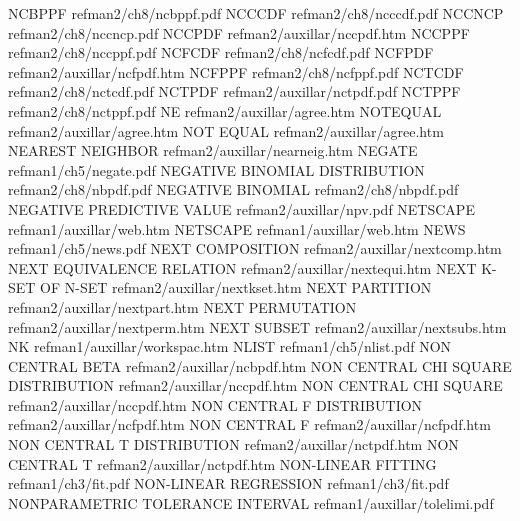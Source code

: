 NCBPPF                                  refman2/ch8/ncbppf.pdf
NCCCDF                                  refman2/ch8/ncccdf.pdf
NCCNCP                                  refman2/ch8/nccncp.pdf
NCCPDF                                  refman2/auxillar/nccpdf.htm
NCCPPF                                  refman2/ch8/nccppf.pdf
NCFCDF                                  refman2/ch8/ncfcdf.pdf
NCFPDF                                  refman2/auxillar/ncfpdf.htm
NCFPPF                                  refman2/ch8/ncfppf.pdf
NCTCDF                                  refman2/ch8/nctcdf.pdf
NCTPDF                                  refman2/auxillar/nctpdf.pdf
NCTPPF                                  refman2/ch8/nctppf.pdf
NE                                      refman2/auxillar/agree.htm
NOTEQUAL                                refman2/auxillar/agree.htm
NOT EQUAL                               refman2/auxillar/agree.htm
NEAREST NEIGHBOR                        refman2/auxillar/nearneig.htm
NEGATE                                  refman1/ch5/negate.pdf
NEGATIVE BINOMIAL DISTRIBUTION          refman2/ch8/nbpdf.pdf
NEGATIVE BINOMIAL                       refman2/ch8/nbpdf.pdf
NEGATIVE PREDICTIVE VALUE               refman2/auxillar/npv.pdf
NETSCAPE                                refman1/auxillar/web.htm
NETSCAPE                                refman1/auxillar/web.htm
NEWS                                    refman1/ch5/news.pdf
NEXT COMPOSITION                        refman2/auxillar/nextcomp.htm
NEXT EQUIVALENCE RELATION               refman2/auxillar/nextequi.htm
NEXT K-SET OF N-SET                     refman2/auxillar/nextkset.htm
NEXT PARTITION                          refman2/auxillar/nextpart.htm
NEXT PERMUTATION                        refman2/auxillar/nextperm.htm
NEXT SUBSET                             refman2/auxillar/nextsubs.htm
NK                                      refman1/auxillar/workspac.htm
NLIST                                   refman1/ch5/nlist.pdf
NON CENTRAL BETA                        refman2/auxillar/ncbpdf.htm
NON CENTRAL CHI SQUARE DISTRIBUTION     refman2/auxillar/nccpdf.htm
NON CENTRAL CHI SQUARE                  refman2/auxillar/nccpdf.htm
NON CENTRAL F DISTRIBUTION              refman2/auxillar/ncfpdf.htm
NON CENTRAL F                           refman2/auxillar/ncfpdf.htm
NON CENTRAL T DISTRIBUTION              refman2/auxillar/nctpdf.htm
NON CENTRAL T                           refman2/auxillar/nctpdf.htm
NON-LINEAR FITTING                      refman1/ch3/fit.pdf
NON-LINEAR REGRESSION                   refman1/ch3/fit.pdf
NONPARAMETRIC TOLERANCE INTERVAL        refman1/auxillar/tolelimi.pdf

